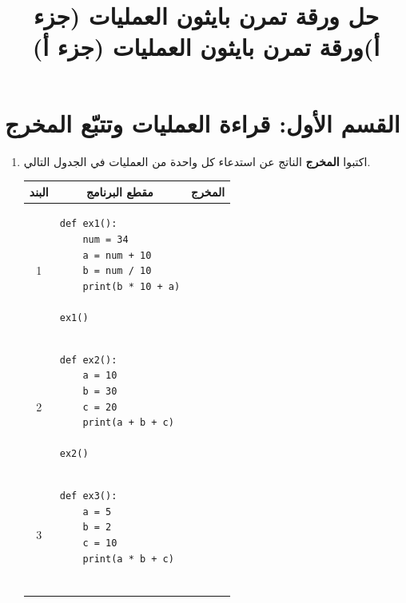 \documentclass[14pt]{extarticle}
\title{حل ورقة تمرن بايثون العمليات (جزء أ)}
\title{ورقة تمرن بايثون العمليات (جزء أ)}
\begin{document}
\maketitle
\thispagestyle{fancy}

\section*{القسم الأول: قراءة العمليات وتتبّع المخرج}

\begin{enumerate}[label=\textbf{تمرين \arabic*:}, wide=0pt, itemsep=2.2em]

\item اكتبوا \textbf{المخرج} الناتج عن استدعاء كل واحدة من العمليات في الجدول التالي.

{\small
\renewcommand{\arraystretch}{1.3}
\begin{longtable}{|c|p{}|p{}|}
\hline
\multicolumn{1}{|c|}{\textbf{البند}} & \multicolumn{1}{c|}{\textbf{مقطع البرنامج}} & \multicolumn{1}{c|}{\textbf{المخرج}} \\
\hline
\endhead
1 &
\begin{pycell}
\begin{english}
\begin{verbatim}
def ex1():
    num = 34
    a = num + 10
    b = num / 10
    print(b * 10 + a)

ex1()
\end{verbatim}
\end{english}
\end{pycell} & \rule{0pt}{1.3cm} \\
\hline
2 &
\begin{pycell}
\begin{english}
\begin{verbatim}
def ex2():
    a = 10
    b = 30
    c = 20
    print(a + b + c)

ex2()
\end{verbatim}
\end{english}
\end{pycell} & \rule{0pt}{1.3cm} \\
\hline
3 &
\begin{pycell}
\begin{english}
\begin{verbatim}
def ex3():
    a = 5
    b = 2
    c = 10
    print(a * b + c)


\end{verbatim}
\end{english}
\end{pycell}
\end{longtable}}
\end{enumerate}
\end{document}
